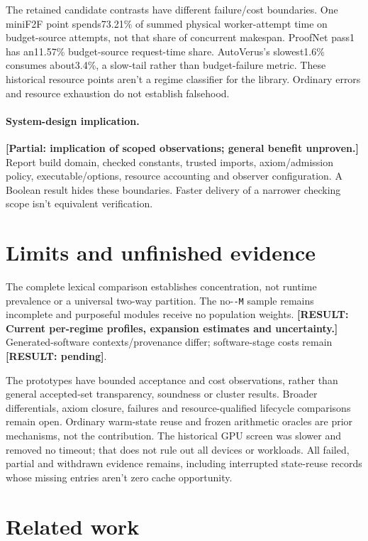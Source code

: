 \documentclass[10pt,twocolumn]{article}
\newcommand{\missing}[1]{\textbf{[RESULT: #1]}}
\newcommand{\partialev}[1]{\textbf{[Partial: #1]}}
\begin{document}
The retained candidate contrasts have different failure/cost boundaries.
One miniF2F point spends73.21\% of summed physical worker-attempt time on
budget-source attempts, not that share of concurrent makespan.
ProofNet pass1 has an11.57\% budget-source request-time share.
AutoVerus's slowest1.6\% consumes about3.4\%, a slow-tail rather than
budget-failure metric.
These historical resource points aren't a regime classifier for the library.
Ordinary errors and resource exhaustion do not establish falsehood.

\paragraph{System-design implication.}
\partialev{implication of scoped observations; general benefit unproven.}
Report build domain, checked constants, trusted imports, axiom/admission
policy, executable/options, resource accounting and observer configuration.
A Boolean result hides these boundaries.
Faster delivery of a narrower checking scope isn't equivalent verification.

\section{Limits and unfinished evidence}
The complete lexical comparison establishes concentration, not runtime
prevalence or a universal two-way partition.
The no-\texttt{-M} sample remains incomplete and purposeful modules receive
no population weights.
\missing{Current per-regime profiles, expansion estimates and uncertainty.}
Generated-software contexts/provenance differ; software-stage costs remain
\missing{pending}.

The prototypes have bounded acceptance and cost observations, rather than
general accepted-set transparency, soundness or cluster results.
Broader differentials, axiom closure, failures and resource-qualified lifecycle
comparisons remain open. Ordinary warm-state reuse and frozen arithmetic oracles
are prior mechanisms, not the contribution.
The historical GPU screen was slower and removed no timeout; that does not
rule out all devices or workloads.
All failed, partial and withdrawn evidence remains, including interrupted
state-reuse records whose missing entries aren't zero cache opportunity.

\section{Related work}
\end{document}
